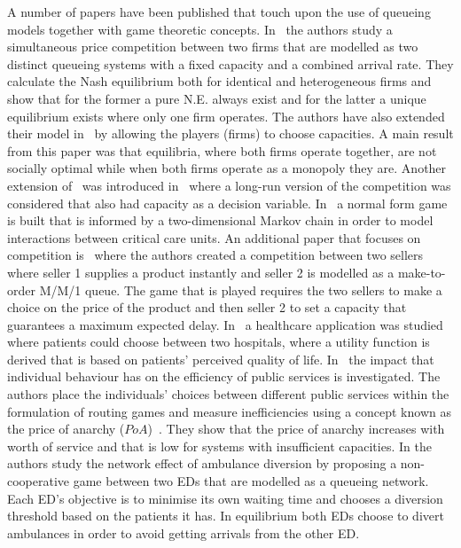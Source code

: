 A number of papers have been published that touch upon the use of 
queueing models together with game theoretic concepts.
In~\cite{FirmCompetition} the authors study a simultaneous price competition 
between two firms that are modelled as two distinct queueing systems with a 
fixed capacity and a combined arrival rate.
They calculate the Nash equilibrium both for identical and heterogeneous firms
and show that for the former a pure N.E. always exist and for the latter a 
unique equilibrium exists where only one firm operates.
The authors have also extended their model in~\cite{FirmCompetition2} by 
allowing the players (firms) to choose capacities. 
A main result from this paper was that equilibria, where both firms operate
together, are not socially optimal while when both firms operate as a monopoly 
they are.
Another extension of~\cite{FirmCompetition} was introduced 
in~\cite{FirmCompetitionExtension} where a long-run version of the competition 
was considered that also had capacity as a decision variable.
In~\cite{knight2017measuring} a normal form game is built that is informed by a 
two-dimensional Markov chain in order to model interactions between critical
care units.
An additional paper that focuses on competition is~\cite{fan2009short} where
the authors created a competition between two sellers where seller 1 supplies 
a product instantly and seller 2 is modelled as a make-to-order M/M/1 queue.
The game that is played requires the two sellers to make a choice on the price 
of the product and then seller 2 to set a capacity that guarantees a maximum 
expected delay.
In~\cite{sadat2015can} a healthcare application was studied where patients 
could choose between two hospitals, where a utility function is derived that is
based on patients' perceived quality of life.
In~\cite{knight2013selfish} the impact that individual behaviour has on the 
efficiency of public services is investigated.
The authors place the individuals' choices between different public services 
within the formulation of routing games and measure inefficiencies using a 
concept known as the price of anarchy (\(PoA\))~\cite{koutsoupias1999worst}.
They show that the price of anarchy increases with worth of service and that is
low for systems with insufficient capacities.
In \cite{deo2011centralized} the authors study the network effect of ambulance 
diversion by proposing a non-cooperative game between two EDs that are modelled
as a queueing network.
Each ED's objective is to minimise its own waiting time and chooses a diversion
threshold based on the patients it has.
In equilibrium both EDs choose to divert ambulances in order to avoid getting
arrivals from the other ED.

